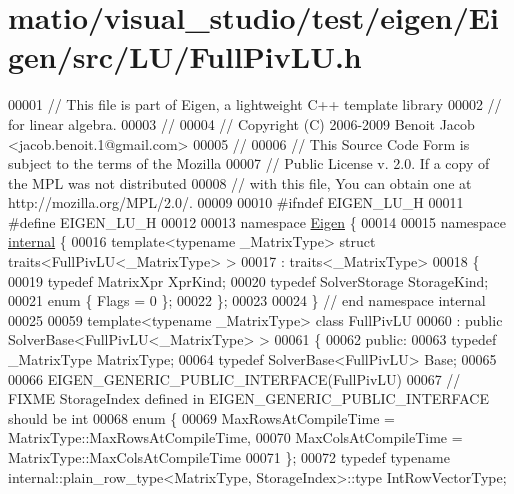 \hypertarget{matio_2visual__studio_2test_2eigen_2_eigen_2src_2_l_u_2_full_piv_l_u_8h_source}{}\section{matio/visual\+\_\+studio/test/eigen/\+Eigen/src/\+L\+U/\+Full\+Piv\+LU.h}
\label{matio_2visual__studio_2test_2eigen_2_eigen_2src_2_l_u_2_full_piv_l_u_8h_source}

\begin{DoxyCode}
00001 \textcolor{comment}{// This file is part of Eigen, a lightweight C++ template library}
00002 \textcolor{comment}{// for linear algebra.}
00003 \textcolor{comment}{//}
00004 \textcolor{comment}{// Copyright (C) 2006-2009 Benoit Jacob <jacob.benoit.1@gmail.com>}
00005 \textcolor{comment}{//}
00006 \textcolor{comment}{// This Source Code Form is subject to the terms of the Mozilla}
00007 \textcolor{comment}{// Public License v. 2.0. If a copy of the MPL was not distributed}
00008 \textcolor{comment}{// with this file, You can obtain one at http://mozilla.org/MPL/2.0/.}
00009 
00010 \textcolor{preprocessor}{#ifndef EIGEN\_LU\_H}
00011 \textcolor{preprocessor}{#define EIGEN\_LU\_H}
00012 
00013 \textcolor{keyword}{namespace }\hyperlink{namespace_eigen}{Eigen} \{
00014 
00015 \textcolor{keyword}{namespace }\hyperlink{namespaceinternal}{internal} \{
00016 \textcolor{keyword}{template}<\textcolor{keyword}{typename} \_MatrixType> \textcolor{keyword}{struct }traits<FullPivLU<\_MatrixType> >
00017  : traits<\_MatrixType>
00018 \{
00019   \textcolor{keyword}{typedef} MatrixXpr XprKind;
00020   \textcolor{keyword}{typedef} SolverStorage StorageKind;
00021   \textcolor{keyword}{enum} \{ Flags = 0 \};
00022 \};
00023 
00024 \} \textcolor{comment}{// end namespace internal}
00025 
00059 \textcolor{keyword}{template}<\textcolor{keyword}{typename} \_MatrixType> \textcolor{keyword}{class }FullPivLU
00060   : \textcolor{keyword}{public} SolverBase<FullPivLU<\_MatrixType> >
00061 \{
00062   \textcolor{keyword}{public}:
00063     \textcolor{keyword}{typedef} \_MatrixType MatrixType;
00064     \textcolor{keyword}{typedef} SolverBase<FullPivLU> Base;
00065 
00066     EIGEN\_GENERIC\_PUBLIC\_INTERFACE(FullPivLU)
00067     \textcolor{comment}{// FIXME StorageIndex defined in EIGEN\_GENERIC\_PUBLIC\_INTERFACE should be int}
00068     \textcolor{keyword}{enum} \{
00069       MaxRowsAtCompileTime = MatrixType::MaxRowsAtCompileTime,
00070       MaxColsAtCompileTime = MatrixType::MaxColsAtCompileTime
00071     \};
00072     \textcolor{keyword}{typedef} \textcolor{keyword}{typename} internal::plain\_row\_type<MatrixType, StorageIndex>::type IntRowVectorType;

\end{DoxyCode}
